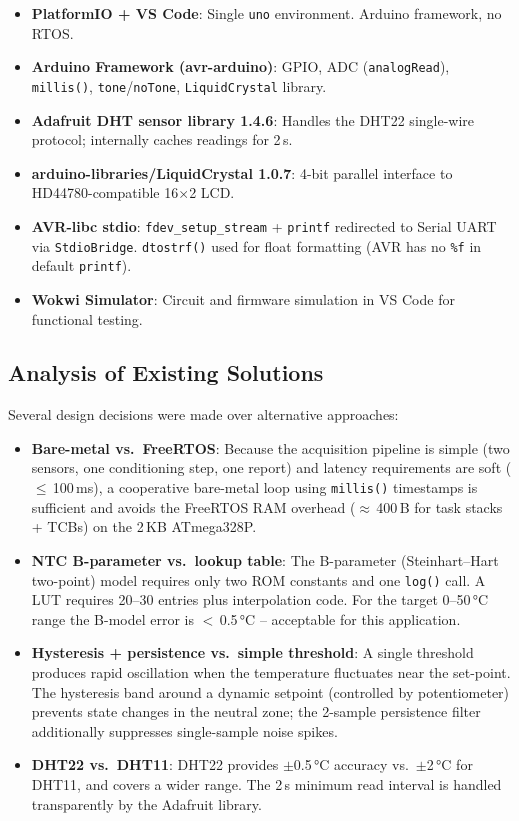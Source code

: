 \documentclass[12pt]{article}
\begin{document}
\begin{itemize}
    \item \textbf{PlatformIO + VS Code}: Single \texttt{uno} environment. Arduino framework, no RTOS.
    \item \textbf{Arduino Framework (avr-arduino)}: GPIO, ADC (\texttt{analogRead}), \texttt{millis()}, \texttt{tone}/\texttt{noTone}, \texttt{LiquidCrystal} library.
    \item \textbf{Adafruit DHT sensor library 1.4.6}: Handles the DHT22 single-wire protocol; internally caches readings for 2\,s.
    \item \textbf{arduino-libraries/LiquidCrystal 1.0.7}: 4-bit parallel interface to HD44780-compatible 16$\times$2 LCD.
    \item \textbf{AVR-libc stdio}: \texttt{fdev\_setup\_stream} + \texttt{printf} redirected to Serial UART via \texttt{StdioBridge}. \texttt{dtostrf()} used for float formatting (AVR has no \texttt{\%f} in default \texttt{printf}).
    \item \textbf{Wokwi Simulator}: Circuit and firmware simulation in VS Code for functional testing.
\end{itemize}

\subsection{Analysis of Existing Solutions}
\hspace{0.8cm} Several design decisions were made over alternative approaches:

\begin{itemize}
    \item \textbf{Bare-metal vs.\ FreeRTOS}: Because the acquisition pipeline is simple (two sensors, one conditioning step, one report) and latency requirements are soft ($\leq$\,100\,ms), a cooperative bare-metal loop using \texttt{millis()} timestamps is sufficient and avoids the FreeRTOS RAM overhead ($\approx$\,400\,B for task stacks + TCBs) on the 2\,KB ATmega328P.
    \item \textbf{NTC B-parameter vs.\ lookup table}: The B-parameter (Steinhart--Hart two-point) model requires only two ROM constants and one \texttt{log()} call. A LUT requires 20--30 entries plus interpolation code. For the target 0--50\,°C range the B-model error is $<$\,0.5\,°C -- acceptable for this application.
    \item \textbf{Hysteresis + persistence vs.\ simple threshold}: A single threshold produces rapid oscillation when the temperature fluctuates near the set-point. The hysteresis band around a dynamic setpoint (controlled by potentiometer) prevents state changes in the neutral zone; the 2-sample persistence filter additionally suppresses single-sample noise spikes.
    \item \textbf{DHT22 vs.\ DHT11}: DHT22 provides $\pm$0.5\,°C accuracy vs.\ $\pm$2\,°C for DHT11, and covers a wider range. The 2\,s minimum read interval is handled transparently by the Adafruit library.
\end{itemize}
\end{document}
